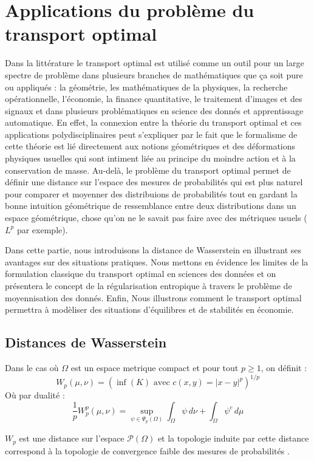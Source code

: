 \documentclass[
    8.2pt,
    a4paper,
    logo,
    twocolumn
]{template}
\renewcommand{\min}{\inf}
\begin{document}
    \section{Applications du problème du transport optimal}
    Dans la littérature le transport optimal est utilisé comme un outil pour un large spectre de problème dans plusieurs branches de mathématiques que ça soit pure ou appliqués :  la géométrie, les mathématiques de la physiques, la recherche opérationnelle, l’économie, la finance quantitative, le traitement d’images et des signaux et dans plusieurs problématiques en science des donnés et apprentissage automatique. En effet, la connexion entre la théorie du transport optimal et ces applications polydisciplinaires peut s’expliquer par le fait que le formalisme de cette théorie est lié directement aux notions géométriques et des déformations physiques usuelles qui sont intiment liée au principe du moindre action et à la conservation de masse. Au-delà, le problème du transport optimal permet de définir une distance sur l’espace des mesures de probabilités qui est plus naturel pour comparer et moyenner des distribuions de probabilités tout en gardant la bonne intuition géométrique de ressemblance entre deux distributions dans un espace géométrique, chose qu’on ne le savait pas faire avec des métriques usuels ($L^p$ par exemple).

    Dans cette partie, nous introduisons la distance de Wasserstein en illustrant ses avantages sur des situations pratiques. Nous mettons en évidence les limites de la formulation classique du transport optimal en sciences des données et on présentera le concept de la régularisation entropique à travers le problème de moyennisation des donnés. Enfin, Nous illustrons comment le transport optimal permettra à modèliser des situations d'équilibres et de stabilités en économie.

    \subsection{Distances de Wasserstein}\label{sec:wasserstein}
    Dans le cas où $\Omega$ est un espace metrique compact et pour tout $p \geq 1$, on définit :
    \[
        W_p(\mu,\nu) = \left( \min (K) \text{ avec } c(x,y) = |x-y|^p \right)^{1/p}
    \]
    Où par dualité :
    \[
        \frac{1}{p} W_p^p(\mu,\nu) = \sup_{\psi \in \Psi_p(\Omega)} \int_{\Omega} \psi \,d\nu + \int_{\Omega} \psi^c \,d\mu
    \]

    $W_p$ est une distance sur l'espace $\mathcal{P}(\Omega)$ et la topologie induite par cette distance correspond à la topologie de convergence faible des mesures de probabilités \citep{santambrogio_introduction_2010}.
\end{document}
